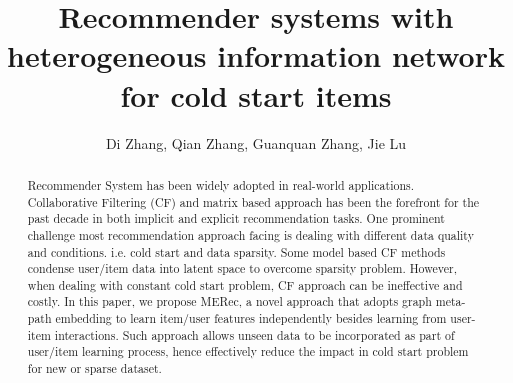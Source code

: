 \documentclass{ws-procs9x6}            %
\begin{document}
\title{Recommender systems with heterogeneous information network for cold start items}

\author{Di Zhang, Qian Zhang, Guanquan Zhang, Jie Lu}

\address{\textit{Decision Systems and e-Service Intelligence Laboratory,} \\
\textit{Centre for Artificial Intelligence}\\
University of Technology Sydney, Australia \\
Di.Zhang-7@student.uts.edu.au, Qian.Zhang-1@uts.edu.au \\
Guangquan.Zhang@uts.edu.au, Jie.Lu@uts.edu.au}

\begin{abstract}
Recommender System has been widely adopted in real-world applications. Collaborative Filtering (CF) and matrix based approach has been the forefront for the past decade in both implicit and explicit recommendation tasks. One prominent challenge most recommendation approach facing is dealing with different data quality and conditions. i.e. cold start and data sparsity. Some model based CF methods condense user/item data into latent space to overcome sparsity problem. However, when dealing with constant cold start problem, CF approach can be ineffective and costly. In this paper, we propose MERec, a novel approach that adopts graph meta-path embedding to learn item/user features independently besides learning from user-item interactions. Such approach allows unseen data to be incorporated as part of user/item learning process, hence effectively reduce the impact in cold start problem for new or sparse dataset.
\end{abstract}


\bodymatter
















\end{document}
